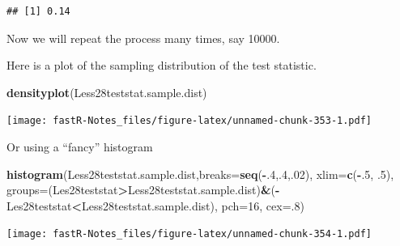 \documentclass[]{book}
\newenvironment{Shaded}{\begin{snugshade}}{\end{snugshade}}
\newcommand{\KeywordTok}[1]{\textcolor[rgb]{0.13,0.29,0.53}{\textbf{#1}}}
\newcommand{\DataTypeTok}[1]{\textcolor[rgb]{0.13,0.29,0.53}{#1}}
\newcommand{\DecValTok}[1]{\textcolor[rgb]{0.00,0.00,0.81}{#1}}
\newcommand{\OtherTok}[1]{\textcolor[rgb]{0.56,0.35,0.01}{#1}}
\newcommand{\OperatorTok}[1]{\textcolor[rgb]{0.81,0.36,0.00}{\textbf{#1}}}
\newcommand{\NormalTok}[1]{#1}
\theoremstyle{definition}
\theoremstyle{definition}
\theoremstyle{definition}
\theoremstyle{remark}
\begin{document}
\begin{verbatim}
## [1] 0.14
\end{verbatim}

Now we will repeat the process many times, say 10000.

\begin{Shaded}
\end{Shaded}

Here is a plot of the sampling distribution of the test statistic.

\begin{Shaded}
\begin{Highlighting}[]
\KeywordTok{densityplot}\NormalTok{(Less28teststat.sample.dist)}
\end{Highlighting}
\end{Shaded}

\texttt{[image: fastR-Notes\_files/figure-latex/unnamed-chunk-353-1.pdf]}

Or using a ``fancy'' histogram

\begin{Shaded}
\begin{Highlighting}[]
\KeywordTok{histogram}\NormalTok{(Less28teststat.sample.dist,}\DataTypeTok{breaks=}\KeywordTok{seq}\NormalTok{(}\OperatorTok{-}\NormalTok{.}\DecValTok{4}\NormalTok{,.}\DecValTok{4}\NormalTok{,.}\DecValTok{02}\NormalTok{), }\DataTypeTok{xlim=}\KeywordTok{c}\NormalTok{(}\OperatorTok{-}\NormalTok{.}\DecValTok{5}\NormalTok{, .}\DecValTok{5}\NormalTok{),}
\DataTypeTok{groups=}\NormalTok{(Les28teststat}\OperatorTok{>}\NormalTok{Less28teststat.sample.dist)}\OperatorTok{&}\NormalTok{(}\OperatorTok{-}\NormalTok{Les28teststat}\OperatorTok{<}\NormalTok{Less28teststat.sample.dist), }\DataTypeTok{pch=}\DecValTok{16}\NormalTok{, }\DataTypeTok{cex=}\NormalTok{.}\DecValTok{8}\NormalTok{)}
\end{Highlighting}
\end{Shaded}

\texttt{[image: fastR-Notes\_files/figure-latex/unnamed-chunk-354-1.pdf]}
\end{document}
